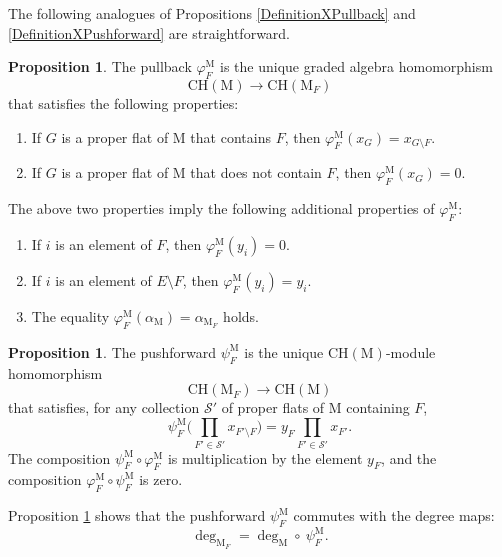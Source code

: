 \documentclass[11pt,reqno]{amsart}
\theoremstyle{definition}
\newtheorem{proposition}[theorem]{Proposition}
\theoremstyle{remark}
\renewcommand{\(}{\left(}
\renewcommand{\)}{\right)}
\newcommand{\<}{\left<}
\renewcommand{\>}{\right>}
\begin{document}
The following analogues of Propositions  \ref{DefinitionXPullback} and \ref{DefinitionXPushforward} are straightforward.

\begin{proposition}\label{DefinitionYPull}
The pullback $\varphi_F^\mathrm{M}$ is the unique graded algebra homomorphism
\[
 \mathrm{CH}(\mathrm{M}) \longrightarrow  \mathrm{CH}(\mathrm{M}_F) 
\]
that satisfies the following properties:
\begin{enumerate}[$\bullet$]\itemsep 5pt
\item If $G$ is a proper flat of $\mathrm{M}$ that contains $F$, then $\varphi_F^{\mathrm{M}}(x_G)=x_{G\setminus F}$.
\item If $G$ is a proper flat of $\mathrm{M}$ that does not contain $F$, then $\varphi_F^{\mathrm{M}}(x_G)=0$.
\end{enumerate}
 The above two properties imply the following additional properties of $\varphi_F^\mathrm{M}$:
 \begin{enumerate}[$\bullet$]\itemsep 5pt
\item If $i$ is an element of $F$, then $\varphi_F^{\mathrm{M}}(y_i)=0$.
\item If $i$ is an element of $E \setminus F$, then $\varphi_F^{\mathrm{M}}(y_i)=y_i$.
\item The equality $\varphi_F^\mathrm{M}(\alpha_\mathrm{M})=\alpha_{\mathrm{M}_F}$ holds.
\end{enumerate}
\end{proposition}


\begin{proposition}\label{DefinitionYPush}
The pushforward  $\psi_F^\mathrm{M}$ is the unique $\mathrm{CH}(\mathrm{M})$-module homomorphism
\[
 \mathrm{CH}(\mathrm{M}_F) \longrightarrow \mathrm{CH}(\mathrm{M})
\]
that satisfies,
for any collection $\mathscr{S}'$ of proper flats of $\mathrm{M}$  containing $F$,
\[
\psi_F^\mathrm{M}\Bigg( \prod_{F' \in \mathscr{S}'} x_{F' \setminus F}\Bigg)=y_F  \prod_{F' \in \mathscr{S}'} x_{F'}.
\]
The composition  $\psi^\mathrm{M}_F \circ \varphi^\mathrm{M}_F$ is multiplication by the element $y_F$,
and  the composition  $\varphi^\mathrm{M}_F \circ \psi^\mathrm{M}_F$ is zero.
\end{proposition}


Proposition \ref{DefinitionYPush} shows that
 the pushforward $\psi_F^\mathrm{M}$ commutes with the degree maps: %
 \[
 \deg_{\mathrm{M}_F}=\deg_\mathrm{M} \circ\ \psi_F^\mathrm{M}.
 \]
\end{document}

